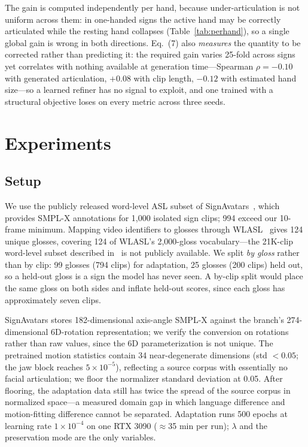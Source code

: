\documentclass{article}
\begin{document}
The gain is computed independently per hand, because under-articulation is not
uniform across them: in one-handed signs the active hand may be correctly
articulated while the resting hand collapses (Table~\ref{tab:perhand}), so a
single global gain is wrong in both directions. Eq.~(7) also \emph{measures} the
quantity to be corrected rather than predicting it: the required gain varies
25-fold across signs yet correlates with nothing available at generation
time---Spearman $\rho = -0.10$ with generated articulation, $+0.08$ with clip
length, $-0.12$ with estimated hand size---so a learned refiner has no signal to
exploit, and one trained with a structural objective loses on every metric across
three seeds.

\section{Experiments}
\label{sec:exp}

\subsection{Setup}
\label{ssec:setup}

We use the publicly released word-level ASL subset of
SignAvatars~\cite{yu2024signavatars}, which provides SMPL-X annotations for 1,000
isolated sign clips; 994 exceed our 10-frame minimum. Mapping video identifiers
to glosses through WLASL~\cite{li2020wlasl} gives 124 unique glosses, covering 124
of WLASL's 2,000-gloss vocabulary---the 21K-clip word-level subset described
in~\cite{yu2024signavatars} is not publicly available. We split \emph{by gloss}
rather than by clip: 99 glosses (794 clips) for adaptation, 25 glosses (200 clips)
held out, so a held-out gloss is a sign the model has never seen. A by-clip split
would place the same gloss on both sides and inflate held-out scores, since each
gloss has approximately seven clips.

SignAvatars stores 182-dimensional axis-angle SMPL-X against the branch's
274-dimensional 6D-rotation representation; we verify the conversion on rotations
rather than raw values, since the 6D parameterization is not unique. The
pretrained motion statistics contain 34 near-degenerate dimensions (std $<0.05$;
the jaw block reaches $5\times10^{-5}$), reflecting a source corpus with
essentially no facial articulation; we floor the normalizer standard deviation at
0.05. After flooring, the adaptation data still has twice the spread of the source
corpus in normalized space---a measured domain gap in which language difference
and motion-fitting difference cannot be separated. Adaptation runs 500 epochs at
learning rate $1\times10^{-4}$ on one RTX 3090 ($\approx$35 min per run);
$\lambda$ and the preservation mode are the only variables.
\end{document}
